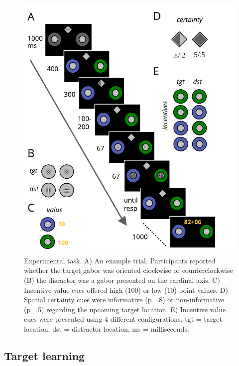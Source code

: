 \documentclass[11pt,halfline,a4paper,]{ouparticle}
\begin{document}
\begin{figure}[p]

{\centering \includegraphics[width=1\linewidth]{../images/doc-task-theory} 

}

\caption{Experimental task. A) An example trial. Participants reported whether the target gabor was oriented clockwise or counterclockwise (B) the disractor was a gabor presented on the cardinal axis. C) Incentive value cues offered high (100) or low (10) point values. D) Spatial certainty cues were informative (p=.8) or non-informative (p=.5) regarding the upcoming target location. E) Incentive value cues were presented using 4 different configurations. tgt = target location, dst = distractor location, ms = milliseconds.}\label{fig:tasktheory}
\end{figure}

\hypertarget{target-learning}{%
\subsection{Target learning}\label{target-learning}}
\end{document}
